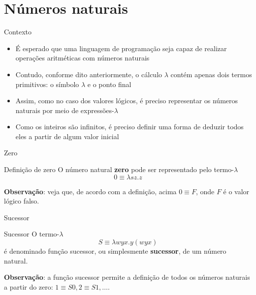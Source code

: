 \section{Números naturais}

\begin{frame}[fragile]{Contexto}

    \begin{itemize}
        \item É esperado que uma linguagem de programação seja capaz de realizar operações
            aritméticas com números naturais

        \item Contudo, conforme dito anteriormente, o cálculo $\lambda$ contém apenas dois
            termos primitivos: o símbolo $\lambda$ e o ponto final

        \item Assim, como no caso dos valores lógicos, é preciso representar os números naturais
            por meio de expressões-$\lambda$

        \item Como os inteiros são infinitos, é preciso definir uma forma de deduzir todos eles
            a partir de algum valor inicial
    \end{itemize}

\end{frame}

\begin{frame}[fragile]{Zero}

    \begin{block}{Definição de zero}
        O número natural \textbf{zero} pode ser representado pelo termo-$\lambda$
        \[
            0 \equiv \lambda sz.z
        \]
    \end{block}

    \vspace{0.1in}

    \textbf{Observação}: veja que, de acordo com a definição, acima $0 \equiv F$, onde $F$ é o
        valor lógico falso.
\end{frame}

\begin{frame}[fragile]{Sucessor}

    \begin{block}{Sucessor}
        O termo-$\lambda$
        \[
            S \equiv \lambda wyx.y(wyx)
        \]
        é denominado função sucessor, ou simplesmente \textbf{sucessor}, de um número
        natural.
    \end{block}

    \vspace{0.2in}

    \textbf{Observação}: a função sucessor permite a definição de todos os números naturais 
        a partir do zero: $1\equiv S0, 2\equiv S1, \ldots$.
\end{frame}

